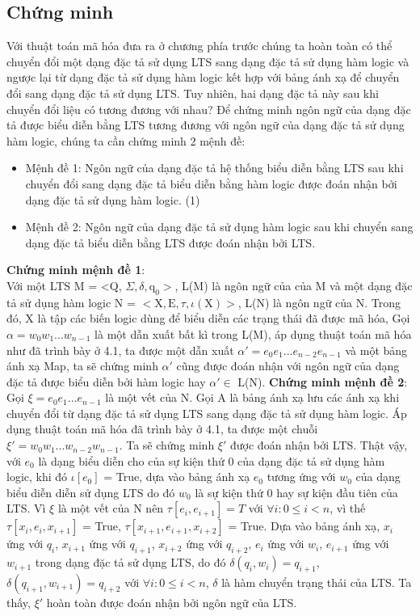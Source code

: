 \documentclass[a4paper,13pt,oneside,openany]{book}
\begin{document}
\begin{flushleft}
		\section{Chứng minh}
		Với thuật toán mã hóa đưa ra ở chương phía trước chúng ta hoàn toàn có thể chuyển đổi một dạng đặc tả sử dụng LTS sang dạng đặc tả sử dụng hàm logic và ngược lại từ dạng đặc tả sử dụng hàm logic kết hợp với bảng ánh xạ để chuyển đổi sang dạng đặc tả sử dụng LTS. Tuy nhiên, hai dạng đặc tả này sau khi chuyển đổi liệu có tương đương với nhau?
		Để chứng minh ngôn ngữ của dạng đặc tả được biểu diễn bằng LTS tương đương với ngôn ngữ của dạng đặc tả sử dụng hàm logic, chúng ta cần chứng minh 2 mệnh đề:
		\begin{itemize}
			\item Mệnh đề 1: Ngôn ngữ của dạng đặc tả hệ thống biểu diễn bằng LTS sau khi chuyển đổi sang dạng đặc tả biểu diễn bằng hàm logic được đoán nhận bởi dạng đặc tả sử dụng hàm logic. (1)\\
			\item Mệnh đề 2: Ngôn ngữ của dạng đặc tả sử dụng hàm logic sau khi chuyển sang dạng đặc tả biểu diễn bằng LTS được đoán nhận bởi LTS.
		\end{itemize}
		\textbf{Chứng minh mệnh đề 1}:\\
		Với một LTS M = <Q, $\Sigma, \delta, \textrm{q}_0>$, L(M) là ngôn ngữ của của M và một dạng đặc tả sử dụng hàm logic N = $<\textrm{X}, \textrm{E}, \tau, \iota(\textrm{X})>$, L(N) là ngôn ngữ của N. Trong đó, X là tập các biến logic dùng để biểu diễn các trạng thái đã được mã hóa,  Gọi $\alpha = w_0w_1...w_{n-1}$ là một dẫn xuất bất kì trong L(M), áp dụng thuật toán mã hóa như đã trình bày ở 4.1, ta được một dẫn xuất $\alpha' = e_0e_1...e_{n-2}e_{n-1}$ và một bảng ánh xạ Map, ta sẽ chứng minh $\alpha'$ cũng được đoán nhận với ngôn ngữ của dạng đặc tả được biểu diễn bởi hàm logic hay $\alpha' \in$ L(N). 
		\textbf{Chứng minh mệnh đề 2}:\\
		Gọi $\xi = e_0e_1...e_{n-1}$ là một vết của N. Gọi A là bảng ánh xạ lưu các ánh xạ khi chuyển đổi từ dạng đặc tả sử dụng LTS sang dạng đặc tả sử dụng hàm logic. Áp dụng thuật toán mã hóa đã trình bày ở 4.1, ta được một chuỗi $\xi' = w_0w_1...w_{n-2}w_{n-1}$. Ta sẽ chứng minh $\xi'$ được đoán nhận bởi LTS. Thật vậy, với $e_0$ là dạng biểu diễn cho của sự kiện thứ 0 của dạng đặc tả sử dụng hàm logic, khi đó $\iota[e_0]$ = True, dựa vào bảng ánh xạ $e_0$ tương ứng với  $w_{0}$ của dạng biểu diễn diễn sử dụng LTS do đó $w_{0}$ là sự kiện thứ 0 hay sự kiện đầu tiên của LTS. Vì $\xi$ là một vết của N nên $\tau[e_i,e_{i+1}] = T$ với $\forall i: 0 \leq i < n$, vì thế $\tau[x_i, e_i, x_{i+1}]$ = True, $\tau[x_{i+1}, e_{i+1}, x_{i+2}]$ = True. Dựa vào bảng ánh xạ, $x_i$ ứng với $q_i$, $x_{i+1}$ ứng với $q_{i+1}$, $x_{i+2}$ ứng với $q_{i+2}$, $e_i$ ứng với $w_i$, $e_{i+1}$ ứng với $w_{i+1}$ trong dạng đặc tả sử dụng LTS, do đó $\delta(q_{i}, w_{i}) = q_{i+1}$, $\delta(q_{i+1}, w_{i+1}) = q_{i+2}$ với $\forall i: 0 \leq i < n$, $\delta$ là hàm chuyển trạng thái của LTS. Ta thấy, $\xi'$ hoàn toàn được đoán nhận bởi ngôn ngữ của LTS.

\end{flushleft}
\end{document}
